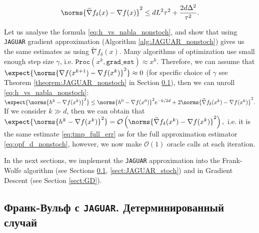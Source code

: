         \begin{equation}
        \label{eq:tmp_full_err}
            \norms{\widetilde{\nabla}f_{\delta}(x) - \nabla f(x)}^2 
            \leq
            d L^2 \tau^2 
            + \frac{2 d \Delta^2}{\tau^2} .
        \end{equation}

        Let us analyse the formula \eqref{eq:h_vs_nabla_nonstoch}, and show that using \texttt{JAGUAR} gradient approximation (Algorithm \ref{alg:JAGUAR_nonstoch}) gives us the same estimates as using $\widetilde{\nabla}f_{\delta}(x)$. Many algorithms of optimization use small enough step size $\gamma$, i.e. $\texttt{Proc}(x^k, \texttt{grad\_est}) \approx x^k$. Therefore, we can assume that $\expect{\norms{\nabla f(x^{k+1}) - \nabla f(x^{k})}^2} \approx 0$ (for specific choice of $\gamma$ see Theorem \ref{theorem:JAGUAR_nonstoch} in Section \ref{sect:FW_via_JAGUAR}), then we can unroll \eqref{eq:h_vs_nabla_nonstoch}:
        $
            \expect{\norms{h^k - \nabla f(x^k)}^2} 
            \leq
            \norms{h^0 - \nabla f(x^0)}^2 e^{-k/2d}
            + 2 \norms{\widetilde{\nabla}f_{\delta}(x^k) - \nabla f(x^k)}^2 .
        $
        If we consider $k \gg d$, then we can obtain that $\expect{\norms{h^k - \nabla f(x^k)}^2} = \mathcal{O}\left( \norms{\widetilde{\nabla}f_{\delta}(x^k) - \nabla f(x^k)}^2 \right),$ i.e. it is the same estimate \eqref{eq:tmp_full_err} as for the full approximation estimator \eqref{eq:opf_d_nonstoch}, however, we now make $\mathcal{O}(1)$ oracle calls at each iteration.
        


        In the next sections, we implement the \texttt{JAGUAR} approximation into the Frank-Wolfe algorithm (see Sections \ref{sect:FW_via_JAGUAR}, \ref{sect:JAGUAR_stoch}) and in Gradient Descent (see Section \ref{sect:GD}).


\subsection{Франк-Вульф с \texttt{JAGUAR}. Детерминированный случай} \label{sect:FW_via_JAGUAR}



